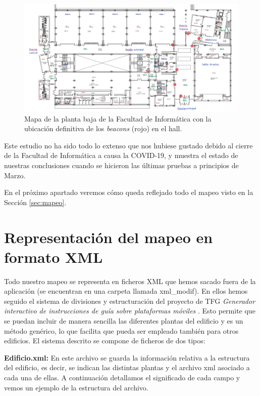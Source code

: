 \begin{figure}[t]
	\centering
	\includegraphics[width=1\textwidth]{Imagenes/Descripciondeltrabajo/beacons_plantabaja_final}
	\caption{Mapa de la planta baja de la Facultad de Informática con la ubicación definitiva de los \textit{beacons} (rojo) en el hall. }
	\label{fig:beaconsPBaja}
\end{figure}

Este estudio no ha sido todo lo extenso que nos hubiese gustado debido al cierre de la Facultad de Informática a causa la COVID-19, y muestra el estado de nuestras conclusiones cuando se hicieron las últimas pruebas a principios de Marzo.

En el próximo apartado veremos cómo queda reflejado todo el mapeo visto en la Sección \ref{sec:mapeo}.

\section{Representación del mapeo en formato XML}
\label{sub:mapeo_xml}
Todo nuestro mapeo se representa en ficheros XML que hemos sacado fuera de la aplicación (se encuentran en una carpeta llamada xml\_modif). En ellos hemos seguido el sistema de divisiones y estructuración del proyecto de TFG \textit{Generador interactivo de instrucciones de guía sobre plataformas móviles} \citep{TFGguia}. Esto permite que se puedan incluir
de manera sencilla las diferentes plantas del edificio y es un método genérico, lo que facilita que pueda ser empleado también para otros edificios. El sistema descrito se compone de ficheros de dos tipos:

\textbf{Edificio.xml:} En este archivo se guarda la información relativa a la estructura del edificio, es decir, se indican las distintas plantas y el archivo xml asociado a cada una de ellas. A continuación detallamos el significado de cada campo y vemos un ejemplo de la estructura del archivo.

